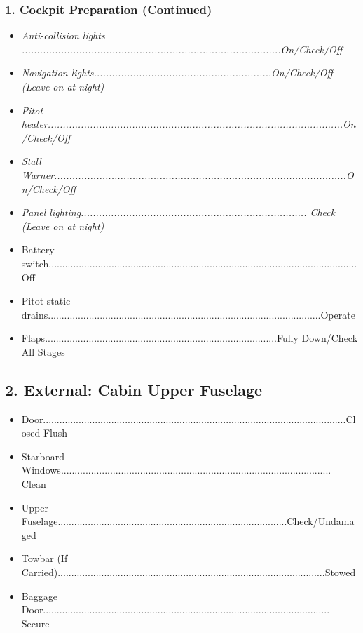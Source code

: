 \documentclass[a4paper]{article}
\newenvironment{checklist}{
  \begin{itemize}[leftmargin=*, align=left]
    \setlength{\itemsep}{2pt}
    \setlength{\parskip}{0pt}
    \setlength{\parsep}{0pt}
}{
  \end{itemize}
}
\begin{document}
\subsubsection*{1. Cockpit Preparation (Continued)}
\begin{checklist}
\item \textit{Anti-collision lights ......................................................................................On/Check/Off}
\item \textit{Navigation lights...........................................................On/Check/Off (Leave on at night)}
\item \textit{Pitot heater..................................................................................................On/Check/Off}
\item \textit{Stall Warner.................................................................................................On/Check/Off}
\item \textit{Panel lighting........................................................................... Check (Leave on at night)}
\item Battery switch.................................................................................................................Off
\item Pitot static drains....................................................................................................Operate
\item Flaps.....................................................................................Fully Down/Check All Stages
\end{checklist}

\subsection*{2. External: Cabin Upper Fuselage}
\begin{checklist}
\item Door...............................................................................................................Closed Flush
\item Starboard Windows................................................................................................... Clean
\item Upper Fuselage....................................................................................Check/Undamaged
\item Towbar (If Carried)..................................................................................................Stowed
\item Baggage Door......................................................................................................... Secure
\end{checklist}
\end{document}
